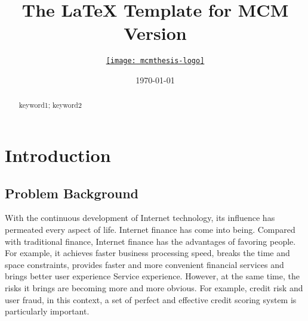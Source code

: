 \documentclass{mcmthesis}
\title{The \LaTeX{} Template for MCM Version \MCMversion}
\author{\small \href{http://www.latexstudio.net/}
  {\texttt{[image: mcmthesis-logo]}}}
\date{\today}
\begin{document}
\begin{abstract}
\lipsum[1]
\begin{keywords}
keyword1; keyword2
\end{keywords}
\end{abstract}
\maketitle
\section{Introduction}
\subsection{Problem Background}
With the continuous development of Internet technology, its influence has permeated every aspect of life. Internet finance has come into being. Compared with traditional finance, Internet finance has the advantages of favoring people. For example, it achieves faster business processing speed, breaks the time and space constraints, provides faster and more convenient financial services and brings better user experience Service experience. However, at the same time, the risks it brings are becoming more and more obvious. For example, credit risk and user fraud, in this context, a set of perfect and effective credit scoring system is particularly important.\\
\end{document}
